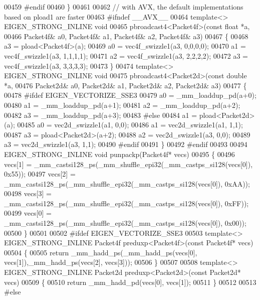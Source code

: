 \begin{DoxyCode}
00459 \textcolor{preprocessor}{  #endif}
00460 \}
00461 
00462 \textcolor{comment}{// with AVX, the default implementations based on pload1 are faster}
00463 \textcolor{preprocessor}{#ifndef \_\_AVX\_\_}
00464 \textcolor{keyword}{template}<> EIGEN\_STRONG\_INLINE \textcolor{keywordtype}{void}
00465 pbroadcast4<Packet4f>(\textcolor{keyword}{const} \textcolor{keywordtype}{float} *a,
00466                       Packet4f& a0, Packet4f& a1, Packet4f& a2, Packet4f& a3)
00467 \{
00468   a3 = pload<Packet4f>(a);
00469   a0 = vec4f\_swizzle1(a3, 0,0,0,0);
00470   a1 = vec4f\_swizzle1(a3, 1,1,1,1);
00471   a2 = vec4f\_swizzle1(a3, 2,2,2,2);
00472   a3 = vec4f\_swizzle1(a3, 3,3,3,3);
00473 \}
00474 \textcolor{keyword}{template}<> EIGEN\_STRONG\_INLINE \textcolor{keywordtype}{void}
00475 pbroadcast4<Packet2d>(\textcolor{keyword}{const} \textcolor{keywordtype}{double} *a,
00476                       Packet2d& a0, Packet2d& a1, Packet2d& a2, Packet2d& a3)
00477 \{
00478 \textcolor{preprocessor}{#ifdef EIGEN\_VECTORIZE\_SSE3}
00479   a0 = \_mm\_loaddup\_pd(a+0);
00480   a1 = \_mm\_loaddup\_pd(a+1);
00481   a2 = \_mm\_loaddup\_pd(a+2);
00482   a3 = \_mm\_loaddup\_pd(a+3);
00483 \textcolor{preprocessor}{#else}
00484   a1 = pload<Packet2d>(a);
00485   a0 = vec2d\_swizzle1(a1, 0,0);
00486   a1 = vec2d\_swizzle1(a1, 1,1);
00487   a3 = pload<Packet2d>(a+2);
00488   a2 = vec2d\_swizzle1(a3, 0,0);
00489   a3 = vec2d\_swizzle1(a3, 1,1);
00490 \textcolor{preprocessor}{#endif}
00491 \}
00492 \textcolor{preprocessor}{#endif}
00493 
00494 EIGEN\_STRONG\_INLINE \textcolor{keywordtype}{void} punpackp(Packet4f* vecs)
00495 \{
00496   vecs[1] = \_mm\_castsi128\_ps(\_mm\_shuffle\_epi32(\_mm\_castps\_si128(vecs[0]), 0x55));
00497   vecs[2] = \_mm\_castsi128\_ps(\_mm\_shuffle\_epi32(\_mm\_castps\_si128(vecs[0]), 0xAA));
00498   vecs[3] = \_mm\_castsi128\_ps(\_mm\_shuffle\_epi32(\_mm\_castps\_si128(vecs[0]), 0xFF));
00499   vecs[0] = \_mm\_castsi128\_ps(\_mm\_shuffle\_epi32(\_mm\_castps\_si128(vecs[0]), 0x00));
00500 \}
00501 
00502 \textcolor{preprocessor}{#ifdef EIGEN\_VECTORIZE\_SSE3}
00503 \textcolor{keyword}{template}<> EIGEN\_STRONG\_INLINE Packet4f preduxp<Packet4f>(\textcolor{keyword}{const} Packet4f* vecs)
00504 \{
00505   \textcolor{keywordflow}{return} \_mm\_hadd\_ps(\_mm\_hadd\_ps(vecs[0], vecs[1]),\_mm\_hadd\_ps(vecs[2], vecs[3]));
00506 \}
00507 
00508 \textcolor{keyword}{template}<> EIGEN\_STRONG\_INLINE Packet2d preduxp<Packet2d>(\textcolor{keyword}{const} Packet2d* vecs)
00509 \{
00510   \textcolor{keywordflow}{return} \_mm\_hadd\_pd(vecs[0], vecs[1]);
00511 \}
00512 
00513 \textcolor{preprocessor}{#else}

\end{DoxyCode}
